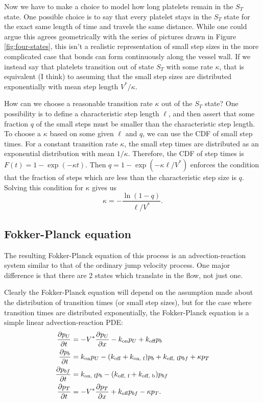 \documentclass{article}
\newcommand{\tn}{\textnormal}
\newcommand{\Pder}[2]{\frac{\partial #1}{\partial #2}}
\begin{document}
Now we have to make a choice to model how long platelets remain in the
$S_T$ state. One possible choice is to say that every platelet stays
in the $S_T$ state for the exact same length of time and travels the
same distance. While one could argue this agrees geometrically with
the series of pictures drawn in Figure \ref{fig:four-states}, this
isn't a realistic representation of small step sizes in the more
complicated case that bonds can form continuously along the vessel
wall. If we instead say that platelets transition out of state $S_T$
with some rate $\kappa$, that is equivalent (I think) to assuming
that the small step sizes are distributed exponentially with mean step
length $V^*/\kappa$.

How can we choose a reasonable transition rate $\kappa$ out of the
$S_T$ state? One possibility is to define a characteristic step length
$\ell$, and then assert that some fraction $q$ of the small steps must
be smaller than the characteristic step length. To choose a $\kappa$
based on some given $\ell$ and $q$, we can use the CDF of small step
times. For a constant transition rate $\kappa$, the small step times
are distributed as an exponential distribution with mean
$1/\kappa$. Therefore, the CDF of step times is
$F(t) = 1 - \exp(-\kappa t)$. Then $q = 1 - \exp(-\kappa \ell/V^*)$
enforces the condition that the fraction of steps which are less than
the characteristic step size is $q$. Solving this condition for
$\kappa$ gives us
\begin{equation}
  \label{eq:kappa-defn}
  \kappa = -\frac{\ln(1 - q)}{\ell/V^*}.
\end{equation}

\subsection{Fokker-Planck equation}
\label{sec:fokk-planck-equat}

The resulting Fokker-Planck equation of this process is an
advection-reaction system similar to that of the ordinary jump
velocity process. One major difference is that there are 2 states
which translate in the flow, not just one.

Clearly the Fokker-Planck equation will depend on the assumption made
about the distribution of transition times (or small step sizes), but
for the case where transition times are distributed exponentially, the
Fokker-Planck equation is a simple linear advection-reaction PDE:
\begin{align}
  \Pder{p_U}{t} &= -V^* \Pder{p_U}{x} - k_\tn{on} p_U + k_\tn{off} p_b
  \\
  \Pder{p_b}{t} &= k_\tn{on} p_U - (k_\tn{off} + k_\tn{on, f}) p_b +
                  k_\tn{off, f} p_{bf} + \kappa p_T \\
  \Pder{p_{bf}}{t} &= k_\tn{on, f} p_b - (k_\tn{off, f} + k_\tn{off,
                     b}) p_{bf} \\
  \Pder{p_T}{t} &= -V^* \Pder{p_T}{x} + k_\tn{off} p_{bf} - \kappa p_T.
\end{align}



% 
% 
\end{document}
